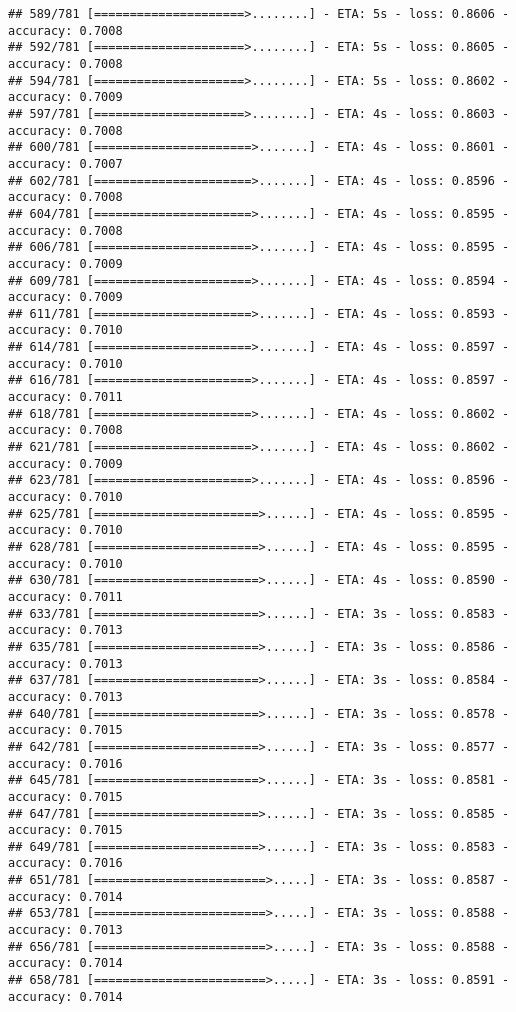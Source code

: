 \documentclass[
]{article}
\begin{document}
\begin{verbatim}
## 589/781 [=====================>........] - ETA: 5s - loss: 0.8606 - accuracy: 0.7008
## 592/781 [=====================>........] - ETA: 5s - loss: 0.8605 - accuracy: 0.7008
## 594/781 [=====================>........] - ETA: 5s - loss: 0.8602 - accuracy: 0.7009
## 597/781 [=====================>........] - ETA: 4s - loss: 0.8603 - accuracy: 0.7008
## 600/781 [======================>.......] - ETA: 4s - loss: 0.8601 - accuracy: 0.7007
## 602/781 [======================>.......] - ETA: 4s - loss: 0.8596 - accuracy: 0.7008
## 604/781 [======================>.......] - ETA: 4s - loss: 0.8595 - accuracy: 0.7008
## 606/781 [======================>.......] - ETA: 4s - loss: 0.8595 - accuracy: 0.7009
## 609/781 [======================>.......] - ETA: 4s - loss: 0.8594 - accuracy: 0.7009
## 611/781 [======================>.......] - ETA: 4s - loss: 0.8593 - accuracy: 0.7010
## 614/781 [======================>.......] - ETA: 4s - loss: 0.8597 - accuracy: 0.7010
## 616/781 [======================>.......] - ETA: 4s - loss: 0.8597 - accuracy: 0.7011
## 618/781 [======================>.......] - ETA: 4s - loss: 0.8602 - accuracy: 0.7008
## 621/781 [======================>.......] - ETA: 4s - loss: 0.8602 - accuracy: 0.7009
## 623/781 [======================>.......] - ETA: 4s - loss: 0.8596 - accuracy: 0.7010
## 625/781 [=======================>......] - ETA: 4s - loss: 0.8595 - accuracy: 0.7010
## 628/781 [=======================>......] - ETA: 4s - loss: 0.8595 - accuracy: 0.7010
## 630/781 [=======================>......] - ETA: 4s - loss: 0.8590 - accuracy: 0.7011
## 633/781 [=======================>......] - ETA: 3s - loss: 0.8583 - accuracy: 0.7013
## 635/781 [=======================>......] - ETA: 3s - loss: 0.8586 - accuracy: 0.7013
## 637/781 [=======================>......] - ETA: 3s - loss: 0.8584 - accuracy: 0.7013
## 640/781 [=======================>......] - ETA: 3s - loss: 0.8578 - accuracy: 0.7015
## 642/781 [=======================>......] - ETA: 3s - loss: 0.8577 - accuracy: 0.7016
## 645/781 [=======================>......] - ETA: 3s - loss: 0.8581 - accuracy: 0.7015
## 647/781 [=======================>......] - ETA: 3s - loss: 0.8585 - accuracy: 0.7015
## 649/781 [=======================>......] - ETA: 3s - loss: 0.8583 - accuracy: 0.7016
## 651/781 [========================>.....] - ETA: 3s - loss: 0.8587 - accuracy: 0.7014
## 653/781 [========================>.....] - ETA: 3s - loss: 0.8588 - accuracy: 0.7013
## 656/781 [========================>.....] - ETA: 3s - loss: 0.8588 - accuracy: 0.7014
## 658/781 [========================>.....] - ETA: 3s - loss: 0.8591 - accuracy: 0.7014

\end{verbatim}
\end{document}
